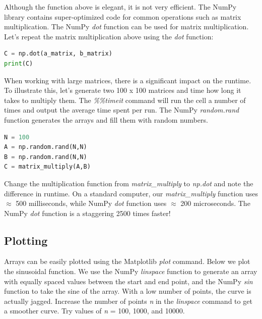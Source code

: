 \documentclass[a4paper , 12pt]{book}
\begin{document}
Although the function above is elegant, it is not very efficient. The NumPy library contains super-optimized code for common operations such as matrix multiplication. The NumPy \textit{dot} function can be used for matrix multiplication. Let's repeat the matrix multiplication above using the \textit{dot} function:

\begin{center}
\begin{lstlisting}[language=Python, frame=single]
C = np.dot(a_matrix, b_matrix)
print(C)
\end{lstlisting}
\end{center}

When working with large matrices, there is a significant impact on the runtime. To illustrate this, let's generate two 100 x 100 matrices and time how long it takes to multiply them. The \textit{\%\%timeit} command will run the cell a number of times and output the average time spent per run. The NumPy \textit{random.rand} function generates the arrays and fill them with random numbers.

\begin{center}
\begin{lstlisting}[language=Python, frame=single]
%%timeit
N = 100
A = np.random.rand(N,N)
B = np.random.rand(N,N)
C = matrix_multiply(A,B)
\end{lstlisting}
\end{center}

Change the multiplication function from \textit{matrix\_multiply} to \textit{np.dot} and note the difference in runtime. On a standard computer, our \textit{matrix\_multiply} function uses $\approx$ 500 milliseconds, while NumPy \textit{dot} function uses $\approx$ 200 microseconds. The NumPy \textit{dot} function is a staggering 2500 times faster!

\subsection{Plotting}

Arrays can be easily plotted using the Matplotlib \textit{plot} command. Below we plot the sinusoidal function. We use the NumPy \textit{linspace} function to generate an array with equally spaced values between the start and end point, and the NumPy \textit{sin} function to take the sine of the array. With a low number of points, the curve is actually jagged. Increase the number of points \textit{n} in the \textit{linspace} command to get a smoother curve. Try values of \textit{n} = 100, 1000, and 10000.
\end{document}

